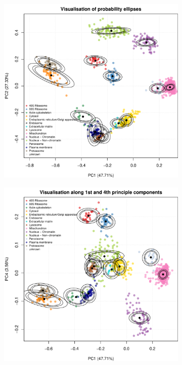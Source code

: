 \documentclass[12pt,english]{article}\usepackage[]{graphicx}\usepackage[]{color}
\makeatletter
\def\maxwidth{ %
  \ifdim\Gin@nat@width>\linewidth
    \linewidth
  \else
    \Gin@nat@width
  \fi
}
\newenvironment{knitrout}{}{} %
\makeatother
\begin{document}
\begin{figure}[ht]
  \begin{subfigure}[t]{0.45\textwidth}
    \centering
\begin{knitrout}
\color{fgcolor}
\includegraphics[width=\maxwidth]{figure/unnamed-chunk-1-1} 

\end{knitrout}
        \caption{}
\end{subfigure}%
\hfill
\begin{subfigure}[t]{0.45\textwidth}
        \centering
\begin{knitrout}
\color{fgcolor}
\includegraphics[width=\maxwidth]{figure/unnamed-chunk-2-1} 


\end{knitrout}
\end{subfigure}
\end{figure}
\end{document}
